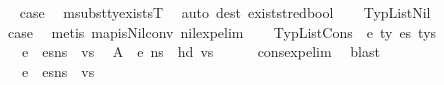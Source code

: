 \begin{isabellebody}
\ \isamarkupfalse%
\ {\isacharquery}{\kern0pt}case\ \isamarkupfalse%
\ msubst{\isacharunderscore}{\kern0pt}ty{\isacharunderscore}{\kern0pt}existsT\ \isamarkupfalse%
\ {\isacharparenleft}{\kern0pt}auto\ dest{\isacharcolon}{\kern0pt}\ existst{\isacharunderscore}{\kern0pt}red{\isacharunderscore}{\kern0pt}bool{\isacharparenright}{\kern0pt}\isanewline
{}\isamarkupfalse%
\isanewline
\ \ \isamarkupfalse%
\ {\isacharparenleft}{\kern0pt}TypListNil\ {\isasymDelta}{\isacharparenright}{\kern0pt}\isanewline
\ \ \isamarkupfalse%
\ \isamarkupfalse%
\ {\isacharquery}{\kern0pt}case\ \isamarkupfalse%
\ {\isacharparenleft}{\kern0pt}metis\ map{\isacharunderscore}{\kern0pt}is{\isacharunderscore}{\kern0pt}Nil{\isacharunderscore}{\kern0pt}conv\ nil{\isacharunderscore}{\kern0pt}exp{\isacharunderscore}{\kern0pt}elim{\isacharparenright}{\kern0pt}\isanewline
{}\isamarkupfalse%
\isanewline
\ \ \isamarkupfalse%
\ {\isacharparenleft}{\kern0pt}TypListCons\ {\isasymDelta}\ e\ ty\ es\ tys{\isacharparenright}{\kern0pt}\isanewline
\ \ \isamarkupfalse%
\ {\isacartoucheopen}{\isasymLambda}{\isacharcomma}{\kern0pt}{\isasymGamma}{\isacharcomma}{\kern0pt}{\isasymOmega}\ {\isasymturnstile}\ {\isasymlangle}{\isacharparenleft}{\kern0pt}e\ {\isacharhash}{\kern0pt}\ es{\isacharparenright}{\kern0pt}{\isacharcomma}{\kern0pt}n{\isacharunderscore}{\kern0pt}s{\isasymrangle}\ {\isacharbrackleft}{\kern0pt}{\isasymDown}{\isacharbrackright}{\kern0pt}\ vs{\isacartoucheclose}\ \isamarkupfalse%
\ A{}{\isacharcolon}{\kern0pt}{\isachardoublequoteopen}{\isasymLambda}{\isacharcomma}{\kern0pt}{\isasymGamma}{\isacharcomma}{\kern0pt}{\isasymOmega}\ {\isasymturnstile}\ {\isasymlangle}e{\isacharcomma}{\kern0pt}\ n{\isacharunderscore}{\kern0pt}s{\isasymrangle}\ {\isasymDown}\ hd\ vs{\isachardoublequoteclose}\isanewline
\ \ \ \ \isamarkupfalse%
\ cons{\isacharunderscore}{\kern0pt}exp{\isacharunderscore}{\kern0pt}elim\ \isamarkupfalse%
\ blast\ \isanewline
\ \ \isamarkupfalse%
\ \isamarkupfalse%
\ {\isacartoucheopen}{\isasymLambda}{\isacharcomma}{\kern0pt}{\isasymGamma}{\isacharcomma}{\kern0pt}{\isasymOmega}\ {\isasymturnstile}\ {\isasymlangle}{\isacharparenleft}{\kern0pt}e\ {\isacharhash}{\kern0pt}\ es{\isacharparenright}{\kern0pt}{\isacharcomma}{\kern0pt}n{\isacharunderscore}{\kern0pt}s{\isasymrangle}\ {\isacharbrackleft}{\kern0pt}{\isasymDown}{\isacharbrackright}{\kern0pt}\ vs{\isacartoucheclose}\ \isamarkupfalse%

\end{isabellebody}
